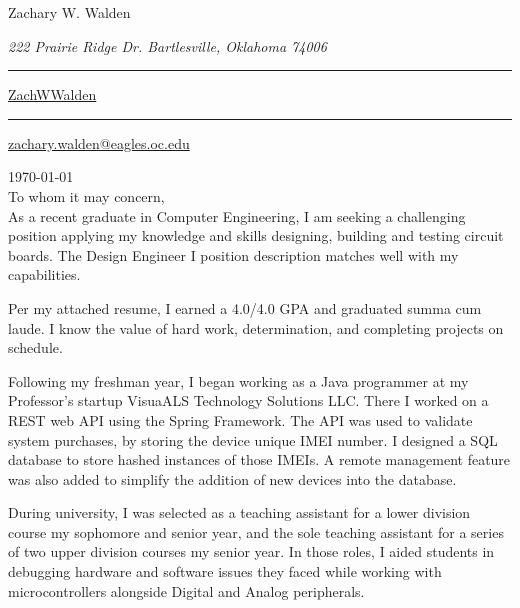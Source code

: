 \documentclass{article}
\newcommand\mybar{\kern1pt\rule[-\dp\strutbox]{.8pt}{\baselineskip}\kern1pt}
\begin{document}
\begin{center}
	\begin{Huge}
		Zachary W. Walden\\
	\end{Huge}
	\begin{large}
		\textsl{222 Prairie Ridge Dr. Bartlesville, Oklahoma 74006}\\
	\end{large}
	\begin{normalsize}
		 \mybar { } \faGithub \href{https://github.com/ZachWWalden}{ ZachWWalden}
		\mybar { }\faEnvelope\href{mailto::zachary.walden@eagles.oc.edu}{ zachary.walden@eagles.oc.edu}
	\end{normalsize}
\end{center}

\begin{adjustwidth}{70pt}{70pt}
\begin{spacing}{1.25}
\vspace*{1.5cm}

\today
\vspace*{.6cm}
\\To whom it may concern,\\

As a recent graduate in Computer Engineering, I am seeking a challenging position applying my knowledge
and  skills designing, building and testing circuit boards. The Design Engineer I position description
matches well with my capabilities.

Per my attached resume, I earned a 4.0/4.0 GPA and graduated summa cum laude. I know the value of hard
work, determination, and completing projects on schedule.

Following my freshman year, I began working as a Java programmer at my Professor's startup VisuaALS Technology Solutions LLC. There I worked on a REST web API using the Spring Framework. The API was used to validate system purchases, by  storing the device unique IMEI number. I designed a SQL database to store hashed instances of those IMEIs. A remote management feature was also added to simplify the addition of new devices into the database.

During university, I was selected as a teaching assistant for a lower division course my sophomore and senior year, and the sole teaching assistant for a series of two upper division courses my senior year.
In those roles, I aided students in debugging hardware and software issues they faced while working with microcontrollers alongside Digital and Analog peripherals.


\end{spacing}
\end{adjustwidth}
\end{document}
